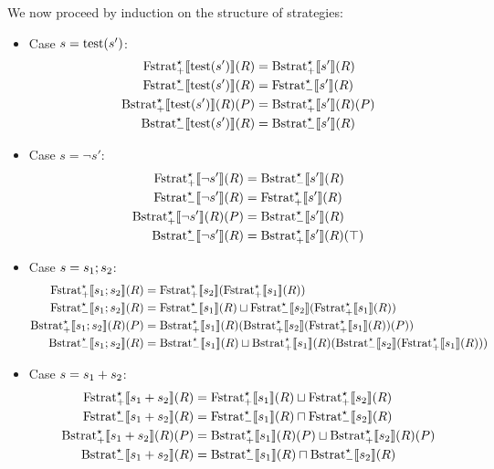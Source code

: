 \documentclass{article}
\newcommand{\seq}[2]{\ensuremath #1 ; #2}
\newcommand{\choice}[2]{\ensuremath #1 + #2}
\newcommand{\test}[1]{\ensuremath \text{test}(#1)}
\newcommand{\Fstratam}[1]{\ensuremath \text{Fstrat}^\star_{-}\llbracket #1 \rrbracket}
\newcommand{\Fstratap}[1]{\ensuremath \text{Fstrat}^\star_{+}\llbracket #1 \rrbracket}
\newcommand{\Bstratap}[1]{\ensuremath \text{Bstrat}_{+}^\star\llbracket #1 \rrbracket}
\newcommand{\Bstratam}[1]{\ensuremath \text{Bstrat}_{-}^\star\llbracket #1 \rrbracket}
\begin{document}
We now proceed by induction on the structure of strategies: 
\begin{itemize}
\item Case $s = \test{s'}$:
  \begin{align*}
    \Fstratap{\test{s'}}(R) &= \Bstratap{s'}(R) \\
    \Fstratam{\test{s'}}(R) &= \Fstratam{s'}(R) \\
    \Bstratap{\test{s'}}(R)(P) &= \Bstratap{s'}(R)(P) \\
    \Bstratam{\test{s'}}(R) &= \Bstratam{s'}(R)
  \end{align*}

\item Case $s = \neg{s'}$:
  \begin{align*}
    \Fstratap{\neg{s'}}(R) &= \Bstratam{s'}(R) \\
    \Fstratam{\neg{s'}}(R) &= \Fstratap{s'}(R) \\
    \Bstratap{\neg{s'}}(R)(P) &= \Bstratam{s'}(R) \\
    \Bstratam{\neg{s'}}(R) &= \Bstratap{s'}(R)(\top)
  \end{align*}

\item Case $s = \seq{s_1}{s_2}$:
  \begin{align*}
    \Fstratap{\seq{s_1}{s_2}}(R) &= \Fstratap{s_2}(\Fstratap{s_1}(R)) \\
    \Fstratam{\seq{s_1}{s_2}}(R) &= \Fstratam{s_1}(R) \sqcup \Fstratam{s_2}(\Fstratap{s_1}(R)) \\
    \Bstratap{\seq{s_1}{s_2}}(R)(P) &= \Bstratap{s_1}(R)(\Bstratap{s_2}(\Fstratap{s_1}(R))(P)) \\
    \Bstratam{\seq{s_1}{s_2}}(R) &= \Bstratam{s_1}(R) \sqcup \Bstratap{s_1}(R)(\Bstratam{s_2}(\Fstratap{s_1}(R)))
  \end{align*}

\item Case $s = \choice{s_1}{s_2}$:
  \begin{align*}
    \Fstratap{\choice{s_1}{s_2}}(R) &= \Fstratap{s_1}(R) \sqcup \Fstratap{s_2}(R) \\
    \Fstratam{\choice{s_1}{s_2}}(R) &= \Fstratam{s_1}(R) \sqcap \Fstratam{s_2}(R) \\
    \Bstratap{\choice{s_1}{s_2}}(R)(P) &= \Bstratap{s_1}(R)(P) \sqcup \Bstratap{s_2}(R)(P) \\
    \Bstratam{\choice{s_1}{s_2}}(R) &= \Bstratam{s_1}(R) \sqcap \Bstratam{s_2}(R)
  \end{align*}


\end{itemize}
\end{document}
